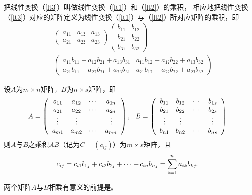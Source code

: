 \begin{frame}
把线性变换（\ref{lt3}）叫做线性变换（\ref{lt1}）和（\ref{lt2}）的乘积，
相应地把线性变换（\ref{lt3}）对应的矩阵定义为线性变换（\ref{lt1}）与（\ref{lt2}）所对应矩阵的乘积，即
$$
\begin{array}{ll}
  & \left(
    \begin{array}{lll}
      a_{11} & a_{12} & a_{13}\\[0.1cm]
      a_{21} & a_{22} & a_{23}
    \end{array}
                        \right)
                        \left(
                        \begin{array}{ll}
                          b_{11} & b_{12} \\[0.1cm]
                          b_{21} & b_{22} \\[0.1cm]
                          b_{31} & b_{32} 
                        \end{array}
                                   \right) \\[0.8cm]
  = & \left(
      \begin{array}{cc}
        a_{11}b_{11} + a_{12}b_{21} + a_{13}b_{31}  &  a_{11}b_{12} + a_{12}b_{22} + a_{13}b_{32} \\[0.1cm]
        a_{21}b_{11} + a_{22}b_{21} + a_{23}b_{31}  &  a_{21}b_{12} + a_{22}b_{22} + a_{23}b_{32}
      \end{array}
                                                      \right)
\end{array}
$$
\end{frame}

\begin{frame}
\begin{dingyi}[矩阵乘法]
  设$A$为$m\times n$矩阵，$B$为$n\times s$矩阵，即
  $$
  A = \left(
    \begin{array}{cccc}
      a_{11} & a_{12} & \cdots & a_{1n}\\
      a_{21} & a_{22} & \cdots & a_{2n}\\
      \vdots   & \vdots   &     & \vdots \\
      a_{m1} & a_{m2} & \cdots & a_{mn}
    \end{array}
  \right), ~~
  B = \left(
    \begin{array}{cccc}
      b_{11} & b_{12} & \cdots & b_{1s}\\
      b_{21} & b_{22} & \cdots & b_{2s}\\
      \vdots   & \vdots   &     & \vdots \\
      b_{n1} & b_{n2} & \cdots & b_{ns}
    \end{array}
  \right)
  $$
  则$A$与$B$之乘积$AB$（记为$C=(c_{ij})$）为$m\times s$矩阵，且
  $$
  c_{ij} = c_{i1}b_{1j} + c_{i2}b_{2j} + \cdots + c_{in}b_{nj} = \sum_{k=1}^na_{ik}b_{kj}.
  $$
\end{dingyi} \pause 
\begin{zhu}
  两个矩阵$A$与$B$相乘有意义的前提是。
\end{zhu}

\end{frame}

